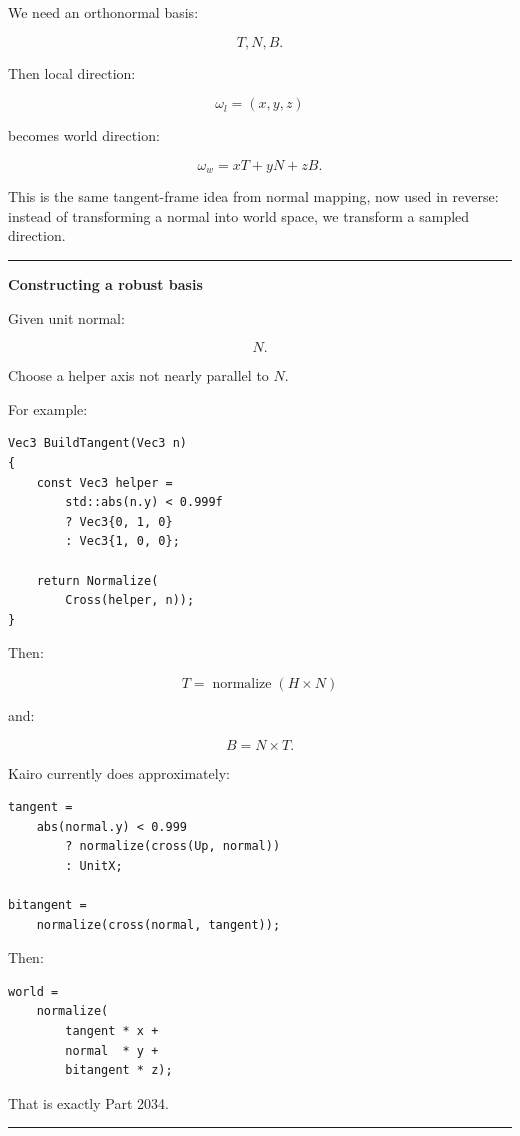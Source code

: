 We need an orthonormal basis:

\[
T,
N,
B.
\]

Then local direction:

\[
\omega_l=(x,y,z)
\]

becomes world direction:

\[
\boxed{
\omega_w
=
xT+
yN+
zB.
}
\]

This is the same tangent-frame idea from normal mapping, now used in reverse: instead of transforming a normal into world space, we transform a sampled direction.

\begin{center}\rule{0.5\linewidth}{0.5pt}\end{center}

\textbf{Constructing a robust basis}

Given unit normal:

\[
N.
\]

Choose a helper axis not nearly parallel to \(N\).

For example:

\begin{verbatim}
Vec3 BuildTangent(Vec3 n)
{
    const Vec3 helper =
        std::abs(n.y) < 0.999f
        ? Vec3{0, 1, 0}
        : Vec3{1, 0, 0};

    return Normalize(
        Cross(helper, n));
}
\end{verbatim}

Then:

\[
T=\operatorname{normalize}(H\times N)
\]

and:

\[
B=N\times T.
\]

Kairo currently does approximately:

\begin{verbatim}
tangent =
    abs(normal.y) < 0.999
        ? normalize(cross(Up, normal))
        : UnitX;

bitangent =
    normalize(cross(normal, tangent));
\end{verbatim}

Then:

\begin{verbatim}
world =
    normalize(
        tangent * x +
        normal  * y +
        bitangent * z);
\end{verbatim}

That is exactly Part 2034.

\begin{center}\rule{0.5\linewidth}{0.5pt}\end{center}

